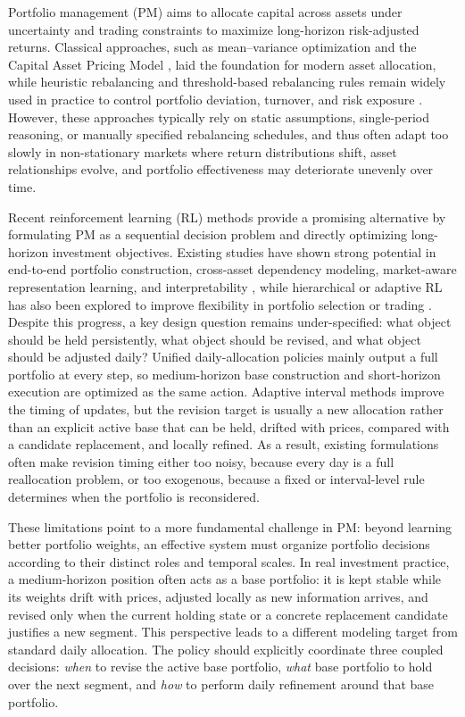 \documentclass[letterpaper]{article} %
\begin{document}
Portfolio management (PM) aims to allocate capital across assets under uncertainty and trading constraints to maximize long-horizon risk-adjusted returns. Classical approaches, such as mean--variance optimization \citep{MVO} and the Capital Asset Pricing Model \citep{CAMP}, laid the foundation for modern asset allocation, while heuristic rebalancing and threshold-based rebalancing rules remain widely used in practice to control portfolio deviation, turnover, and risk exposure \citep{Perold1988DynamicSF,9}. However, these approaches typically rely on static assumptions, single-period reasoning, or manually specified rebalancing schedules, and thus often adapt too slowly in non-stationary markets where return distributions shift, asset relationships evolve, and portfolio effectiveness may deteriorate unevenly over time.

Recent reinforcement learning (RL) methods provide a promising alternative by formulating PM as a sequential decision problem and directly optimizing long-horizon investment objectives. Existing studies have shown strong potential in end-to-end portfolio construction, cross-asset dependency modeling, market-aware representation learning, and interpretability \citep{4,5,6,8,alphastock}, while hierarchical or adaptive RL has also been explored to improve flexibility in portfolio selection or trading \citep{25}. Despite this progress, a key design question remains under-specified: what object should be held persistently, what object should be revised, and what object should be adjusted daily? Unified daily-allocation policies mainly output a full portfolio at every step, so medium-horizon base construction and short-horizon execution are optimized as the same action. Adaptive interval methods improve the timing of updates, but the revision target is usually a new allocation rather than an explicit active base that can be held, drifted with prices, compared with a candidate replacement, and locally refined. As a result, existing formulations often make revision timing either too noisy, because every day is a full reallocation problem, or too exogenous, because a fixed or interval-level rule determines when the portfolio is reconsidered.

These limitations point to a more fundamental challenge in PM: beyond learning better portfolio weights, an effective system must organize portfolio decisions according to their distinct roles and temporal scales. In real investment practice, a medium-horizon position often acts as a base portfolio: it is kept stable while its weights drift with prices, adjusted locally as new information arrives, and revised only when the current holding state or a concrete replacement candidate justifies a new segment. This perspective leads to a different modeling target from standard daily allocation. The policy should explicitly coordinate three coupled decisions: \emph{when} to revise the active base portfolio, \emph{what} base portfolio to hold over the next segment, and \emph{how} to perform daily refinement around that base portfolio.
\end{document}
